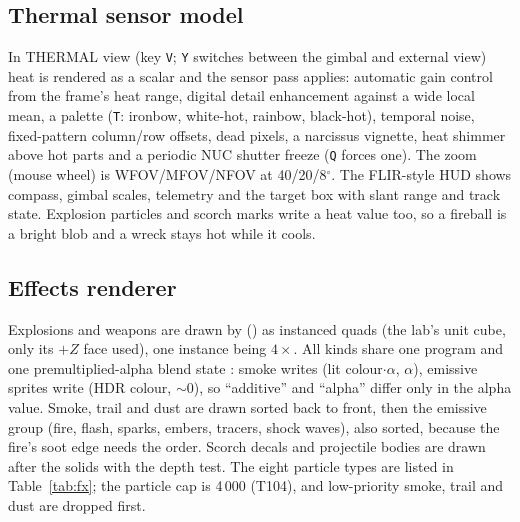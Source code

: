 \subsection{Thermal sensor model}
In THERMAL view (key \texttt{V}; \texttt{Y} switches between the gimbal and external view) heat is
rendered as a scalar and the sensor pass applies: automatic gain control from the frame's heat range, digital detail enhancement against a wide local mean, a palette (\texttt{T}: ironbow, white-hot, rainbow,
black-hot), temporal noise, fixed-pattern column/row offsets, dead pixels, a narcissus vignette, heat shimmer above
hot parts and a periodic NUC shutter freeze (\texttt{Q} forces one). The zoom (mouse wheel) is WFOV/MFOV/NFOV at
40/20/8$^\circ$. The FLIR-style HUD shows compass, gimbal scales, telemetry and the target box with slant range and track state.
Explosion particles and scorch marks write a heat value too, so a fireball is a bright blob and a wreck stays hot while it cools.

\subsection{Effects renderer}
Explosions and weapons are drawn by  () as instanced
quads (the lab's unit cube, only its $+Z$ face used), one instance being $4\times$. All kinds share one program and one premultiplied-alpha blend state
: smoke writes (lit colour$\cdot\alpha$, $\alpha$), emissive sprites write
(HDR colour, $\sim0$), so ``additive'' and ``alpha'' differ only in the alpha value. Smoke, trail and
dust are drawn sorted back to front, then the emissive group (fire, flash, sparks, embers, tracers, shock waves), also sorted, because
the fire's soot edge needs the order. Scorch decals and projectile bodies are drawn after the solids with the
depth test. The eight particle types are listed in Table~\ref{tab:fx}; the particle cap is 4\,000 (T104), and low-priority smoke, trail and
dust are dropped first.

